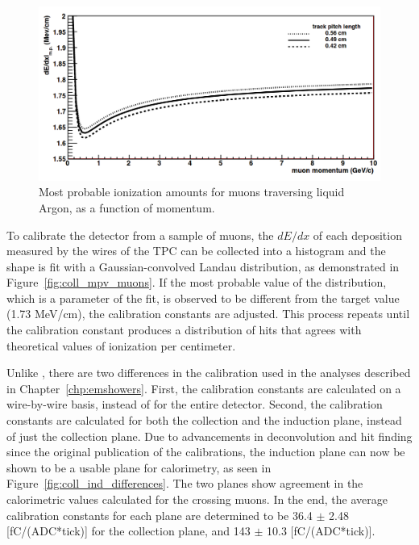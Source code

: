 \begin{figure}[tb]
  \centering
  \includegraphics[width=\textwidth]{lartpc_figures/mpv_muons.png}
  \caption[Most Probable Ionization, Muons]{Most probable ionization amounts for muons traversing liquid Argon, as a function of momentum.}
  \label{fig:mpv_muons}
\end{figure}

To calibrate the detector from a sample of muons, the $dE/dx$ of each deposition measured by the wires of the TPC can be collected into a histogram and the shape is fit with a Gaussian-convolved Landau distribution, as demonstrated in Figure~\ref{fig:coll_mpv_muons}.  If the most probable value of the distribution, which is a parameter of the fit, is observed to be different from the target value (1.73 MeV/cm), the calibration constants are adjusted.  This process repeats until the calibration constant produces a distribution of hits that agrees with theoretical values of ionization per centimeter.

Unlike \cite{Anderson:2012mra}, there are two differences in the calibration used in the analyses described in Chapter~\ref{chp:emshowers}. First, the calibration constants are calculated on a wire-by-wire basis, instead of for the entire detector.  Second, the calibration constants are calculated for both the collection and the induction plane, instead of just the collection plane.  Due to advancements in deconvolution and hit finding since the original publication of the \argoneut calibrations, the induction plane can now be shown to be a usable plane for calorimetry, as seen in Figure~\ref{fig:coll_ind_differences}.  The two planes show agreement in the calorimetric values calculated for the crossing muons.  In the end, the average calibration constants for each plane are determined to be 36.4 $\pm$ 2.48 [fC/(ADC*tick)] for the collection plane, and 143 $\pm$ 10.3 [fC/(ADC*tick)].

